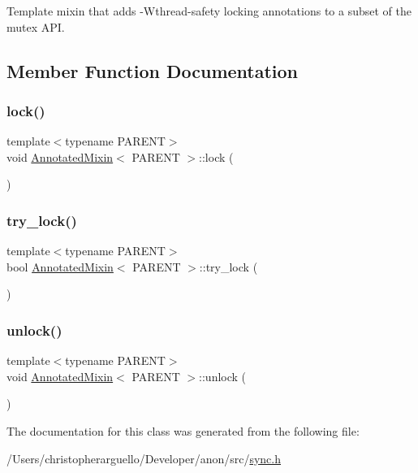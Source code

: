 Template mixin that adds -\/\+Wthread-\/safety locking annotations to a subset of the mutex A\+PI. 

\subsection{Member Function Documentation}
\mbox{\label{class_annotated_mixin_ad1f35c6d1b8a8e980fff45e7e7cb46d3}} 
\subsubsection{\texorpdfstring{lock()}{lock()}}
{\footnotesize\ttfamily template$<$typename P\+A\+R\+E\+NT$>$ \\
void \mbox{\hyperlink{class_annotated_mixin}{Annotated\+Mixin}}$<$ P\+A\+R\+E\+NT $>$\+::lock (\begin{DoxyParamCaption}{ }\end{DoxyParamCaption})\hspace{0.3cm}{\ttfamily [inline]}}

\mbox{\label{class_annotated_mixin_a9a33deab2da56790d8b5d30b1fd8350d}} 
\subsubsection{\texorpdfstring{try\+\_\+lock()}{try\_lock()}}
{\footnotesize\ttfamily template$<$typename P\+A\+R\+E\+NT$>$ \\
bool \mbox{\hyperlink{class_annotated_mixin}{Annotated\+Mixin}}$<$ P\+A\+R\+E\+NT $>$\+::try\+\_\+lock (\begin{DoxyParamCaption}{ }\end{DoxyParamCaption})\hspace{0.3cm}{\ttfamily [inline]}}

\mbox{\label{class_annotated_mixin_acc2e3da37c2d9dd483b859572e32bc24}} 
\subsubsection{\texorpdfstring{unlock()}{unlock()}}
{\footnotesize\ttfamily template$<$typename P\+A\+R\+E\+NT$>$ \\
void \mbox{\hyperlink{class_annotated_mixin}{Annotated\+Mixin}}$<$ P\+A\+R\+E\+NT $>$\+::unlock (\begin{DoxyParamCaption}{ }\end{DoxyParamCaption})\hspace{0.3cm}{\ttfamily [inline]}}



The documentation for this class was generated from the following file\+:\begin{DoxyCompactItemize}
\item 
/\+Users/christopherarguello/\+Developer/anon/src/\mbox{\hyperlink{sync_8h}{sync.\+h}}\end{DoxyCompactItemize}
